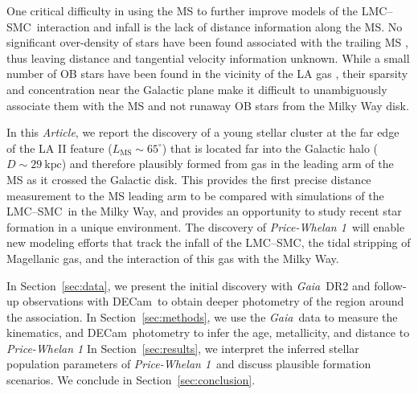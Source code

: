 \documentclass[twocolumn]{aastex62}
\newcommand{\acronym}[1]{{\small{#1}}}
\newcommand{\gaia}{\textsl{Gaia}}
\newcommand{\decam}{DECam}
\newcommand{\DR}[1]{\acronym{DR#1}}
\newcommand{\articlename}{\textsl{Article}}
\newcommand{\sectionname}{Section}
\newcommand{\clustername}{\textsl{Price-Whelan 1}}
\newcommand{\lmcsmc}{LMC--SMC}
\newcommand{\cldist}{\ensuremath{29~\textrm{kpc}}}
\begin{document}
One critical difficulty in using the MS to further improve models of the \lmcsmc\ interaction and infall is the lack of distance information along the MS.
No significant over-density of stars have been found associated with the trailing MS \citep{Guhathakurta:1998}, thus leaving distance and tangential velocity information unknown.
While a small number of OB stars have been found in the vicinity of the LA gas \citep{Casetti-Dinescu:2014, Zhang:2017}, their sparsity and concentration near the Galactic plane make it difficult to unambiguously associate them with the MS and not runaway OB stars from the Milky Way disk.

In this \articlename, we report the discovery of a young stellar cluster at the far edge of the LA II feature ($L_{\textrm{MS}} \sim 65^\circ$) that is located far into the Galactic halo ($D \sim \cldist$) and therefore plausibly formed from gas in the leading arm of the MS as it crossed the Galactic disk.
This provides the first precise distance measurement to the MS leading arm to be compared with simulations of the \lmcsmc\ in the Milky Way, and provides an opportunity to study recent star formation in a unique environment.
The discovery of \clustername\ will enable new modeling efforts that track the infall of the \lmcsmc, the tidal stripping of Magellanic gas, and the interaction of this gas with the Milky Way.

In \sectionname~\ref{sec:data}, we present the initial discovery with \gaia\ \DR{2} and follow-up observations with \decam\ to obtain deeper photometry of the region around the association.
In \sectionname~\ref{sec:methods}, we use the \gaia\ data to measure the kinematics, and \decam\ photometry to infer the age, metallicity, and distance to \clustername
In \sectionname~\ref{sec:results}, we interpret the inferred stellar population parameters of \clustername\ and discuss plausible formation scenarios.
We conclude in \sectionname~\ref{sec:conclusion}.
\end{document}
